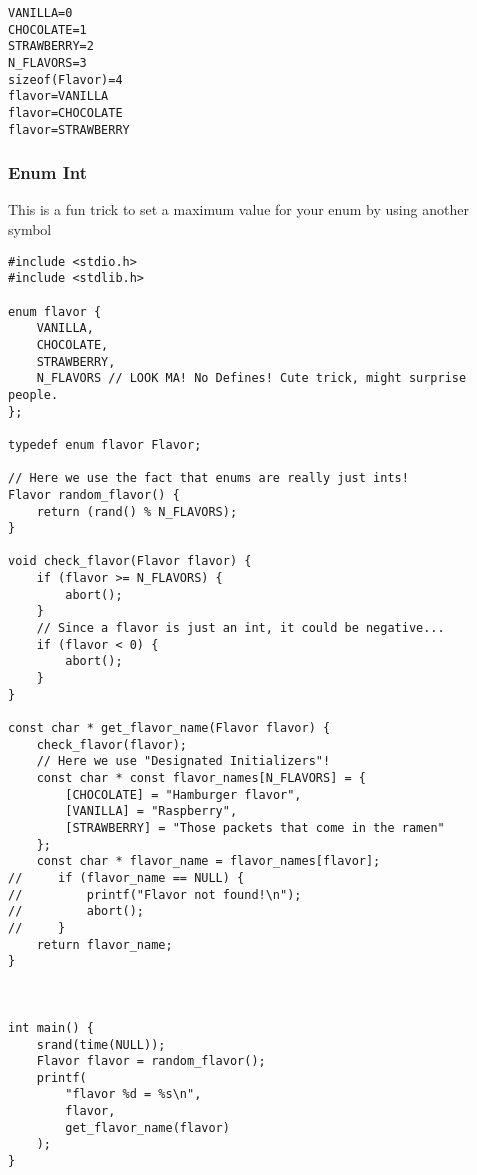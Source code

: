 \documentclass[11pt]{article}
\begin{document}
\begin{verbatim}
VANILLA=0
CHOCOLATE=1
STRAWBERRY=2
N_FLAVORS=3
sizeof(Flavor)=4
flavor=VANILLA
flavor=CHOCOLATE
flavor=STRAWBERRY
\end{verbatim}

\subsubsection{Enum Int}
\label{sec:org36ac2e4}

This is a fun trick to set a maximum value for your enum by using
another symbol

\begin{verbatim}
#include <stdio.h>
#include <stdlib.h>

enum flavor {
    VANILLA,
    CHOCOLATE,
    STRAWBERRY,
    N_FLAVORS // LOOK MA! No Defines! Cute trick, might surprise people.
};

typedef enum flavor Flavor;

// Here we use the fact that enums are really just ints!
Flavor random_flavor() {
    return (rand() % N_FLAVORS);
}

void check_flavor(Flavor flavor) {
    if (flavor >= N_FLAVORS) {
        abort();
    }
    // Since a flavor is just an int, it could be negative...
    if (flavor < 0) {
        abort();
    }
}

const char * get_flavor_name(Flavor flavor) {
    check_flavor(flavor);
    // Here we use "Designated Initializers"!
    const char * const flavor_names[N_FLAVORS] = {
        [CHOCOLATE] = "Hamburger flavor",
        [VANILLA] = "Raspberry",
        [STRAWBERRY] = "Those packets that come in the ramen"
    };
    const char * flavor_name = flavor_names[flavor];
//     if (flavor_name == NULL) {
//         printf("Flavor not found!\n");
//         abort();
//     }
    return flavor_name;
}



int main() {
    srand(time(NULL));
    Flavor flavor = random_flavor();
    printf(
        "flavor %d = %s\n",
        flavor,
        get_flavor_name(flavor)
    );
}
\end{verbatim}
\end{document}
